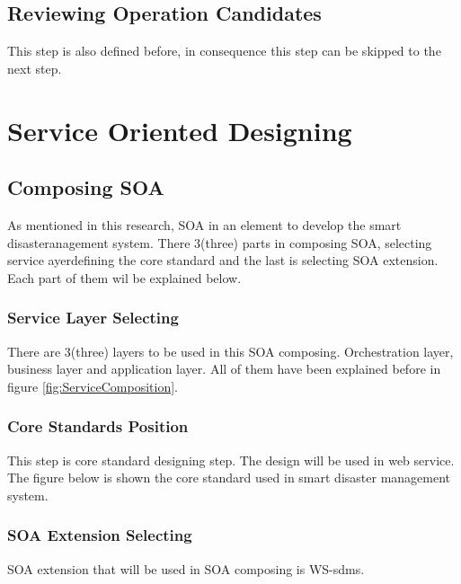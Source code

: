 \subsection{Reviewing Operation Candidates}
This step is also defined before, in consequence this step can be skipped to the next step.
\section{Service Oriented Designing}
\vspace{-0.5cm}
\subsection{Composing SOA}
As mentioned in this research, SOA in an element to develop the smart disasteranagement system. There 3(three) parts in composing SOA, selecting service ayerdefining the core standard and the last is selecting SOA extension. Each part of them wil be explained below.

\subsubsection{Service Layer Selecting}
There are 3(three) layers to be used in this SOA composing. Orchestration layer, business layer and application layer. All of them have been explained before in figure \ref{fig:ServiceComposition}.

\subsubsection{Core Standards Position}
This step is core standard designing step. The design will be used in web service. The figure below is shown the core standard used in smart disaster management system.

\subsubsection{SOA Extension Selecting}
SOA extension that will be used in SOA composing is WS-sdms.

